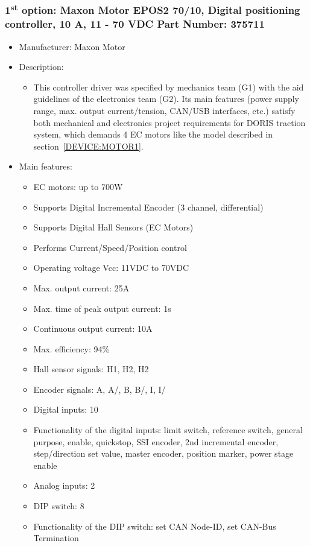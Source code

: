 \subsubsection{1\textsuperscript{st} option: Maxon Motor EPOS2 70/10, Digital positioning controller, 10 A, 11 - 70 VDC Part Number: 375711} \label{DEVICE:DRIVER1}
\begin{itemize}
  \item Manufacturer: Maxon Motor
  \item Description:
  \begin{itemize}
    \item This controller driver was specified by mechanics team (G1) with the aid guidelines of the electronics team (G2). Its main features (power supply range, max. output current/tension, CAN/USB interfaces, etc.) satisfy both mechanical and electronics project requirements for DORIS traction system, which demands 4 EC motors like the model described in section~\ref{DEVICE:MOTOR1}.
  \end{itemize}
  \item Main features:
  \begin{itemize}
    \item EC motors: up to 700W
    \item Supports Digital Incremental Encoder (3 channel, differential)
    \item Supports Digital Hall Sensors (EC Motors)
    \item Performs Current/Speed/Position control
    \item Operating voltage Vcc: 11VDC to 70VDC
    \item Max. output current: 25A
    \item Max. time of peak output current: 1s
    \item Continuous output current: 10A
    \item Max. efficiency: 94\%
    \item Hall sensor signals: H1, H2, H2
    \item Encoder signals: A, A/, B, B/, I, I/
    \item Digital inputs: 10
    \item Functionality of the digital inputs: limit switch, reference switch, general purpose, enable, quickstop, SSI encoder, 2nd incremental encoder, step/direction set value, master encoder, position marker, power stage enable
    \item Analog inputs: 2
    \item DIP switch: 8
    \item Functionality of the DIP switch: set CAN Node-ID, set CAN-Bus Termination

\end{itemize}
\end{itemize}
